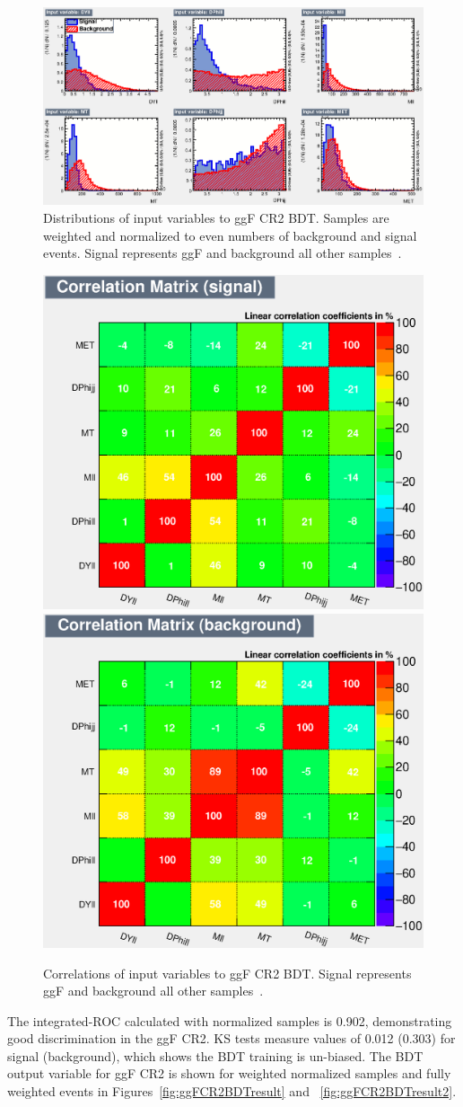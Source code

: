 \begin{figure}[!htbp]
    \centering
    \includegraphics[width=0.7\linewidth]{Pictures/ggFCR2/variables_id_c1.eps}
    \caption{Distributions of input variables to ggF CR2 BDT. Samples are weighted and normalized to even numbers of background and signal events. Signal represents ggF and background all other samples~\cite{ourSupportNote}.}
    \label{fig:ggFCR2BDTinput}
\end{figure}
\begin{figure}[!htbp]
\centering
  \includegraphics[width=.45\linewidth]{Pictures/ggFCR2/CorrelationMatrixS.eps}
  \includegraphics[width=.45\linewidth]{Pictures/ggFCR2/CorrelationMatrixB.eps}
\caption{Correlations of input variables to ggF CR2 BDT. Signal represents ggF and background all other samples~\cite{ourSupportNote}.}
\label{fig:ggFCR2corrSB}
\end{figure}

The integrated-ROC calculated with normalized samples is 0.902, demonstrating good discrimination in the ggF CR2. KS tests measure values of 0.012 (0.303) for signal (background), which shows the BDT training is un-biased. The BDT output variable for ggF CR2 is shown for weighted normalized samples and fully weighted events in Figures~\ref{fig:ggFCR2BDTresult} and ~\ref{fig:ggFCR2BDTresult2}. 

